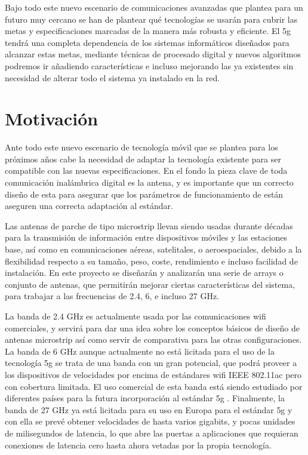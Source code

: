 \par Bajo todo este nuevo escenario de comunicaciones avanzadas que plantea para un futuro muy cercano se han de plantear qué tecnologías se usarán para cubrir las metas y especificaciones marcadas de la manera más robusta y eficiente. El \gls{5g} tendrá una completa dependencia de los sistemas informáticos diseñados para alcanzar estas metas, mediante técnicas de procesado digital y nuevos algoritmos podremos ir añadiendo características e incluso mejorando las ya existentes sin necesidad de alterar todo el sistema ya instalado en la red.

\section{Motivación}
\par Ante todo este nuevo escenario de tecnología móvil que se plantea para los próximos años cabe la necesidad de adaptar la tecnología existente para ser compatible con las nuevas especificaciones. En el fondo la pieza clave de toda comunicación inalámbrica digital es la antena, y es importante que un correcto diseño de esta para asegurar que los parámetros de funcionamiento de están aseguren una correcta adaptación al estándar. 
\\
\par Las antenas de parche de tipo microstrip llevan siendo usadas durante décadas para la transmisión de información entre dispositivos móviles y las estaciones base, así como en comunicaciones aéreas, satelitales, o aeroespaciales, debido a la flexibilidad respecto a su tamaño, peso, coste, rendimiento e incluso facilidad de instalación. En este proyecto se diseñarán y analizarán una serie de arrays o conjunto de antenas, que permitirán mejorar ciertas características del sistema, para trabajar a las frecuencias de 2.4, 6, e incluso 27 GHz. 
\\
\par La banda de 2.4 GHz es actualmente usada por las comunicaciones \gls{wifi} comerciales, y servirá para dar una idea sobre los conceptos básicos de diseño de antenas microstrip así como servir de comparativa para las otras configuraciones. La banda de 6 GHz aunque actualmente no está licitada para el uso de la tecnología \gls{5g} se trata de una banda con un gran potencial, que podrá proveer a los dispositivos de velocidades por encima de estándares \gls{wifi} IEEE 802.11ac pero con cobertura limitada. El uso comercial de esta banda está siendo estudiado por diferentes países para la futura incorporación al estándar \gls{5g} \cite{5GAmericas2019}. Finalmente, la banda de 27 GHz ya está licitada para su uso en Europa para el estándar \gls{5g} y con ella se prevé obtener velocidades de hasta varios gigabits, y pocas unidades de milisegundos de latencia, lo que abre las puertas a aplicaciones que requieran conexiones de latencia cero hasta ahora vetadas por la propia tecnología.



